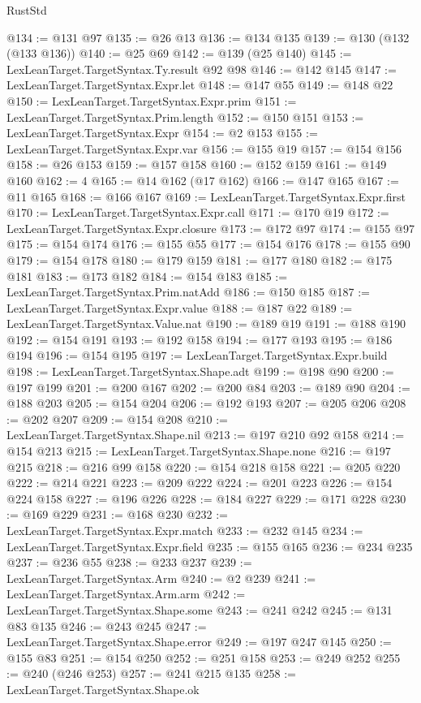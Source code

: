 \begin{lexlean}{RustStd}
\begin{coremodule}
@134 := @131 @97
@135 := @26 @13
@136 := @134 @135
@139 := @130 (@132 (@133 @136))
@140 := @25 @69
@142 := @139 (@25 @140)
@145 := LexLeanTarget.TargetSyntax.Ty.result @92 @98
@146 := @142 @145
@147 := LexLeanTarget.TargetSyntax.Expr.let
@148 := @147 @55
@149 := @148 @22
@150 := LexLeanTarget.TargetSyntax.Expr.prim
@151 := LexLeanTarget.TargetSyntax.Prim.length
@152 := @150 @151
@153 := LexLeanTarget.TargetSyntax.Expr
@154 := @2 @153
@155 := LexLeanTarget.TargetSyntax.Expr.var
@156 := @155 @19
@157 := @154 @156
@158 := @26 @153
@159 := @157 @158
@160 := @152 @159
@161 := @149 @160
@162 := 4
@165 := @14 @162 (@17 @162)
@166 := @147 @165
@167 := @11 @165
@168 := @166 @167
@169 := LexLeanTarget.TargetSyntax.Expr.first
@170 := LexLeanTarget.TargetSyntax.Expr.call
@171 := @170 @19
@172 := LexLeanTarget.TargetSyntax.Expr.closure
@173 := @172 @97
@174 := @155 @97
@175 := @154 @174
@176 := @155 @55
@177 := @154 @176
@178 := @155 @90
@179 := @154 @178
@180 := @179 @159
@181 := @177 @180
@182 := @175 @181
@183 := @173 @182
@184 := @154 @183
@185 := LexLeanTarget.TargetSyntax.Prim.natAdd
@186 := @150 @185
@187 := LexLeanTarget.TargetSyntax.Expr.value
@188 := @187 @22
@189 := LexLeanTarget.TargetSyntax.Value.nat
@190 := @189 @19
@191 := @188 @190
@192 := @154 @191
@193 := @192 @158
@194 := @177 @193
@195 := @186 @194
@196 := @154 @195
@197 := LexLeanTarget.TargetSyntax.Expr.build
@198 := LexLeanTarget.TargetSyntax.Shape.adt
@199 := @198 @90
@200 := @197 @199
@201 := @200 @167
@202 := @200 @84
@203 := @189 @90
@204 := @188 @203
@205 := @154 @204
@206 := @192 @193
@207 := @205 @206
@208 := @202 @207
@209 := @154 @208
@210 := LexLeanTarget.TargetSyntax.Shape.nil
@213 := @197 @210 @92 @158
@214 := @154 @213
@215 := LexLeanTarget.TargetSyntax.Shape.none
@216 := @197 @215
@218 := @216 @99 @158
@220 := @154 @218 @158
@221 := @205 @220
@222 := @214 @221
@223 := @209 @222
@224 := @201 @223
@226 := @154 @224 @158
@227 := @196 @226
@228 := @184 @227
@229 := @171 @228
@230 := @169 @229
@231 := @168 @230
@232 := LexLeanTarget.TargetSyntax.Expr.match
@233 := @232 @145
@234 := LexLeanTarget.TargetSyntax.Expr.field
@235 := @155 @165
@236 := @234 @235
@237 := @236 @55
@238 := @233 @237
@239 := LexLeanTarget.TargetSyntax.Arm
@240 := @2 @239
@241 := LexLeanTarget.TargetSyntax.Arm.arm
@242 := LexLeanTarget.TargetSyntax.Shape.some
@243 := @241 @242
@245 := @131 @83 @135
@246 := @243 @245
@247 := LexLeanTarget.TargetSyntax.Shape.error
@249 := @197 @247 @145
@250 := @155 @83
@251 := @154 @250
@252 := @251 @158
@253 := @249 @252
@255 := @240 (@246 @253)
@257 := @241 @215 @135
@258 := LexLeanTarget.TargetSyntax.Shape.ok

\end{coremodule}
\end{lexlean}
